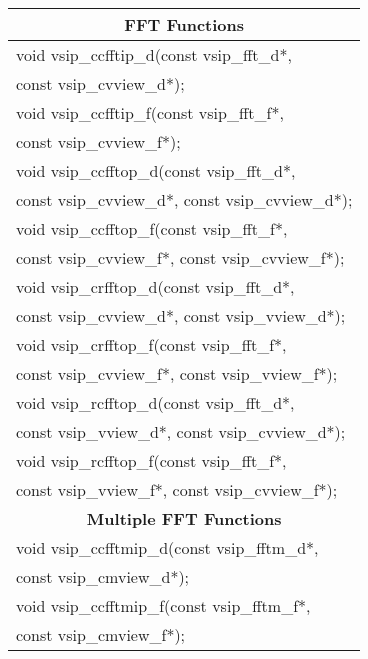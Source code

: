 \newline \hspace*{1.1cm} {
\ttfamily
\begin{tabular}[H]{l} \hline
\hline \multicolumn{1}{c}{\rmfamily \bfseries FFT Functions}\\ \hline
void vsip\_ccfftip\_d(const vsip\_fft\_d*,\\*\hspace{.7cm}const vsip\_cvview\_d*);\\
void vsip\_ccfftip\_f(const vsip\_fft\_f*,\\*\hspace{.7cm} const vsip\_cvview\_f*);\\
void vsip\_ccfftop\_d(const vsip\_fft\_d*,\\*\hspace{.7cm} const vsip\_cvview\_d*, const vsip\_cvview\_d*);\\
void vsip\_ccfftop\_f(const vsip\_fft\_f*,\\*\hspace{.7cm} const vsip\_cvview\_f*, const vsip\_cvview\_f*);\\
void vsip\_crfftop\_d(const vsip\_fft\_d*,\\*\hspace{.7cm} const vsip\_cvview\_d*, const vsip\_vview\_d*);\\
void vsip\_crfftop\_f(const vsip\_fft\_f*,\\*\hspace{.7cm} const vsip\_cvview\_f*, const vsip\_vview\_f*);\\
void vsip\_rcfftop\_d(const vsip\_fft\_d*,\\*\hspace{.7cm} const vsip\_vview\_d*, const vsip\_cvview\_d*);\\
void vsip\_rcfftop\_f(const vsip\_fft\_f*,\\*\hspace{.7cm} const vsip\_vview\_f*, const vsip\_cvview\_f*);\\ \hline \multicolumn{1}{c}{\rmfamily \bfseries Multiple FFT Functions}\\ \hline
void vsip\_ccfftmip\_d(const vsip\_fftm\_d*,\\*\hspace{.7cm} const vsip\_cmview\_d*);\\
void vsip\_ccfftmip\_f(const vsip\_fftm\_f*,\\*\hspace{.7cm} const vsip\_cmview\_f*);\\

\end{tabular}}

